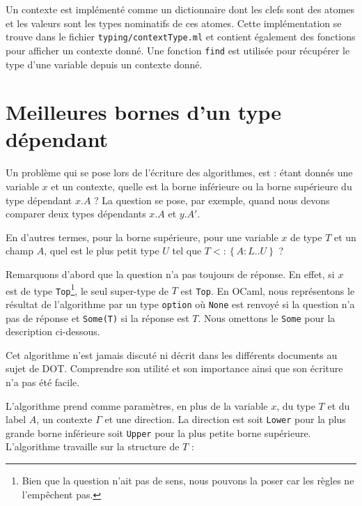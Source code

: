 Un contexte est implémenté comme un dictionnaire dont les clefs sont des atomes
et les valeurs sont les types nominatifs de ces atomes. Cette implémentation se
trouve dans le fichier \verb|typing/contextType.ml| et contient également
des fonctions pour afficher un contexte donné. Une fonction \verb|find| est utilisée
pour récupérer le type d'une variable depuis un contexte donné.

\section{Meilleures bornes d'un type dépendant}

Un problème qui se pose lors de l'écriture des algorithmes, est : étant donnés une variable
$x$ et un contexte, quelle est la borne inférieure ou la borne supérieure du
type dépendant $x.A$ ? La question se pose, par exemple, quand nous devons
comparer deux types dépendants $x.A$ et $y.A'$.

En d'autres termes, pour la borne supérieure, pour une variable $x$ de type $T$ et
un champ $A$, quel est le plus petit type $U$ tel que $T <: \left\{ A : L .. U
\right\}$ ?

Remarquons d'abord que la question n'a pas toujours de réponse. En effet, si $x$
est de type \verb|Top|\footnote{Bien que la question n'ait pas de sens, nous
  pouvons la poser car les règles ne l'empêchent pas.}, le seul super-type de
$T$ est \verb|Top|. En OCaml, nous représentons le résultat de l'algorithme par un
type \verb|option| où \verb|None| est renvoyé si la question n'a pas de réponse
et \verb|Some(T)| si la réponse est $T$. Nous omettons le \verb|Some| pour la
description ci-dessous.

Cet algorithme n'est jamais discuté ni décrit dans les différents
documents au sujet de DOT. Comprendre son utilité et son importance ainsi que
son écriture n'a pas été facile.

L'algorithme prend comme
paramètres, en plus de la variable $x$, du type $T$ et du label $A$, un contexte
$\Gamma$ et une direction. La direction est soit \verb|Lower| pour la
plus grande borne inférieure soit \verb|Upper| pour la plus petite borne
supérieure. L'algorithme travaille sur la structure de $T$ :

